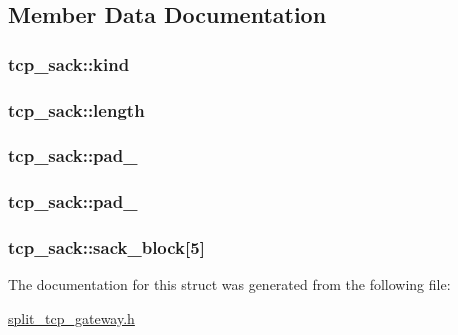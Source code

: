 \subsection{\-Member \-Data \-Documentation}
\hypertarget{structtcp__sack_acdca33b1e8c3971e1290782cc5595c0f}{
\subsubsection[{kind}]{ {\bf tcp\-\_\-sack\-::kind}}}\label{structtcp__sack_acdca33b1e8c3971e1290782cc5595c0f}
\hypertarget{structtcp__sack_a85395de82d87dd9a987320d5d27c48fb}{
\subsubsection[{length}]{ {\bf tcp\-\_\-sack\-::length}}}\label{structtcp__sack_a85395de82d87dd9a987320d5d27c48fb}
\hypertarget{structtcp__sack_a5c3aee8a5a49aedbf2748f6f59dd91e7}{
\subsubsection[{pad\-\_\-1}]{ {\bf tcp\-\_\-sack\-::pad\-\_}}}\label{structtcp__sack_a5c3aee8a5a49aedbf2748f6f59dd91e7}
\hypertarget{structtcp__sack_ada362f6194b8cdf78587682882a89843}{
\subsubsection[{pad\-\_\-2}]{ {\bf tcp\-\_\-sack\-::pad\-\_}}}\label{structtcp__sack_ada362f6194b8cdf78587682882a89843}
\hypertarget{structtcp__sack_ad10a084fa496be3cad68023841f6ebe4}{
\subsubsection[{sack\-\_\-block}]{ {\bf tcp\-\_\-sack\-::sack\-\_\-block}\mbox{[}5\mbox{]}}}\label{structtcp__sack_ad10a084fa496be3cad68023841f6ebe4}


\-The documentation for this struct was generated from the following file\-:\begin{DoxyCompactItemize}
\item 
\hyperlink{split__tcp__gateway_8h}{split\-\_\-tcp\-\_\-gateway.\-h}\end{DoxyCompactItemize}
